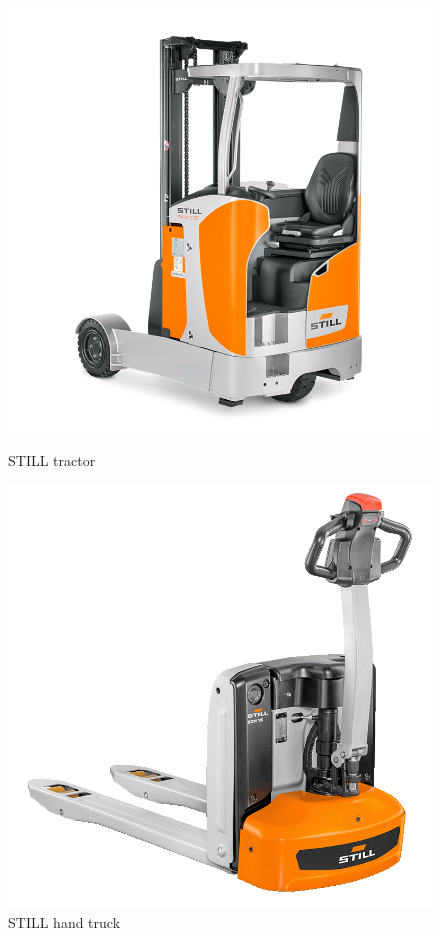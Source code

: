 \begin{figure}[h!]
    \centering
    \begin{minipage}{0.45\textwidth}
        \centering
        \includegraphics[width=\linewidth]{images/Chap0/Reach trucks.png} %
        \caption{STILL tractor}
        \label{Reach trucks}
    \end{minipage}
    \begin{minipage}{0.45\textwidth}
        \centering
        \includegraphics[width=\linewidth]{images/Chap0/hand truck.png} %
        \caption{STILL hand truck}
        \label{hand truck}
    \end{minipage}
\end{figure}

